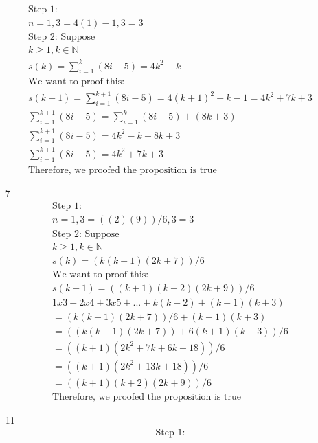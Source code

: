 \documentclass[12pt]{article}
\begin{document}
\begin{enumerate}
\begin{equation*}
	    	\begin{split}
		    \text{Step 1:}\\
		    n = 1, 3 = 4(1) -1, 3 = 3\\
		    \text{Step 2: Suppose}\\
		    k \ge 1, k \in \mathbb{N}\\
		    s(k) = \sum_{i=1}^k(8i-5)=4k^2 -k\\
		    \text{We want to proof this:}\\
		    s(k+1) = \sum_{i=1}^{k+1}(8i-5)=4(k+1)^2 -k -1 = 4k^2 +7k +3\\
		    \sum_{i=1}^{k+1}(8i-5)= \sum_{i=1}^{k} (8i-5) + (8k + 3)\\
		    \sum_{i=1}^{k+1}(8i-5)= 4k^2-k + 8k + 3\\
		    \sum_{i=1}^{k+1}(8i-5)= 4k^2 + 7k + 3\\
		    \text{Therefore, we proofed the proposition is true}
	    	\end{split}
	    \end{equation*}
	\item [7] 
	    \begin{equation*}
	    	\begin{split}
		    \text{Step 1:}\\
		    n = 1, 3 = ((2)(9))/6, 3 = 3\\
		    \text{Step 2: Suppose}\\
		    k \ge 1, k \in \mathbb{N}\\
		    s(k) = (k(k+1)(2k+7))/6\\
		    \text{We want to proof this:}\\
		    s(k+1) = ((k+1)(k+2)(2k + 9))/6\\
		    1x3 + 2x4 + 3x5 + ... + k(k + 2) + (k+1)(k+3)\\
		    = (k(k+1)(2k+7))/6 + (k+1)(k+3)\\
		    = ((k(k+1)(2k+7)) + 6(k+1)(k+3))/6\\
		    = ((k+1)(2k^2+7k + 6k+18))/6\\
		    = ((k+1)(2k^2+13k+18))/6\\
		    = ((k+1)(k+2)(2k+9))/6\\
		    \text{Therefore, we proofed the proposition is true}
	    	\end{split}
	    \end{equation*}
	\item [11] 
	    \begin{equation*}
	    	\begin{split}
		    \text{Step 1:}\\

\end{split}
\end{equation*}
\end{enumerate}
\end{document}
